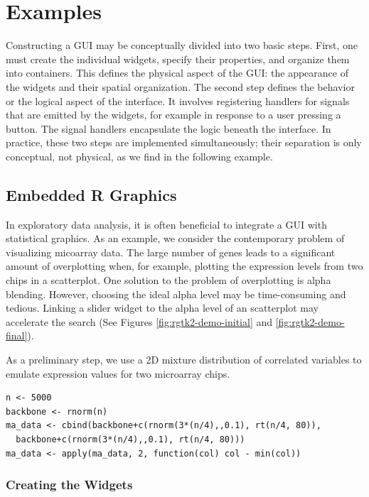\documentclass[article]{jss}
\begin{document}
\section{Examples}

Constructing a GUI may be conceptually divided into two basic steps.
First, one must create the individual widgets, specify their properties,
and organize them into containers. This defines the physical aspect
of the GUI: the appearance of the widgets and their spatial organization.
The second step defines the behavior or the logical aspect of the
interface. It involves registering handlers for signals that are emitted
by the widgets, for example in response to a user pressing a button.
The signal handlers encapsulate the logic beneath the interface. In
practice, these two steps are implemented simultaneously; their separation
is only conceptual, not physical, as we find in the following example.

\subsection{Embedded R Graphics}

In exploratory data analysis, it is often beneficial to integrate
a GUI with statistical graphics. As an example, we consider the contemporary
problem of visualizing micoarray data. The large number of genes leads
to a significant amount of overplotting when, for example, plotting
the expression levels from two chips in a scatterplot. One solution
to the problem of overplotting is alpha blending. However, choosing
the ideal alpha level may be time-consuming and tedious. Linking a
slider widget to the alpha level of an  scatterplot may accelerate
the search (See Figures \ref{fig:rgtk2-demo-initial} and \ref{fig:rgtk2-demo-final}). 

As a preliminary step, we use a 2D mixture distribution of correlated variables
to emulate expression values for two microarray chips. 
\begin{verbatim}
n <- 5000
backbone <- rnorm(n)
ma_data <- cbind(backbone+c(rnorm(3*(n/4),,0.1), rt(n/4, 80)), 
  backbone+c(rnorm(3*(n/4),,0.1), rt(n/4, 80)))
ma_data <- apply(ma_data, 2, function(col) col - min(col))
\end{verbatim}

\subsubsection{Creating the Widgets}
\end{document}
